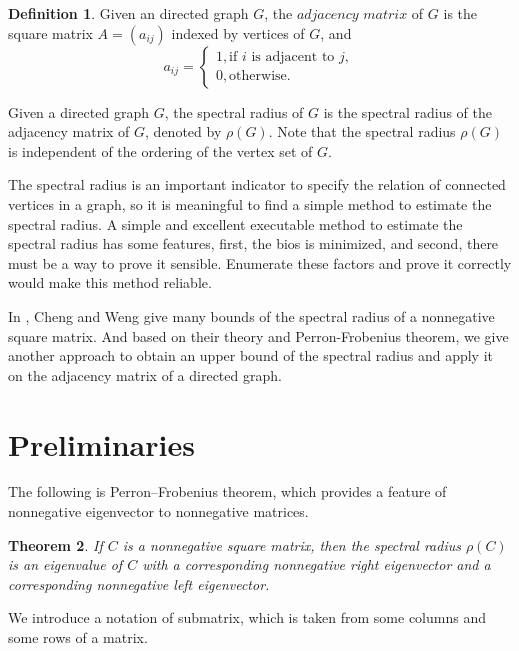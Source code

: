 \documentclass[12pt, a4paper]{article}
\theoremstyle{plain}
\newtheorem{thm}{Theorem}[section]
\theoremstyle{definition}
\newtheorem{defn}[thm]{Definition}
\begin{document}
\begin{defn}
Given an directed graph $G$, the $\textit{adjacency matrix}$ of
 $G$ is the square
 matrix $A = (a_{ij})$ indexed by vertices of $G$, and
     \[a_{ij} =\begin{cases}
        1, \text{if $i$ is adjacent to $j$}, \\
        0, \text{otherwise.}
            \end{cases}
     \]
\end{defn}

Given a directed graph $G$, the spectral radius of $G$ is the
 spectral radius of the adjacency matrix of $G$, denoted by
 $\rho(G)$. Note that the spectral radius $\rho(G)$ is
 independent of the ordering of the vertex set of $G$.

The spectral radius is an important indicator to specify the relation
 of connected vertices in a graph, so it is meaningful to find a simple
 method to estimate the spectral radius. A simple and excellent
 executable method to estimate the spectral radius has some features,
 first, the bios is minimized, and second, there must be a way to prove
 it sensible. Enumerate these factors and prove it correctly would make this method reliable.

In \cite{chang}, Cheng and Weng give many bounds of the spectral radius of a nonnegative square matrix. And based on their theory and Perron-Frobenius theorem, we give another approach to obtain an upper bound of the spectral radius and apply it on the adjacency matrix of a directed graph.

\section{Preliminaries}

The following is Perron–Frobenius theorem, which provides a feature of
 nonnegative eigenvector to nonnegative matrices.

\begin{thm} \cite{prn_fros2} \label{thm:Perron_Frobenius}
    If $C$ is a nonnegative square matrix, then the spectral radius $\rho(C)$ is an
    eigenvalue of $C$ with a corresponding nonnegative right eigenvector and a
    corresponding nonnegative left eigenvector.
\end{thm}

We introduce a notation of submatrix, which is taken from some columns and some rows of a
 matrix.
\end{document}
